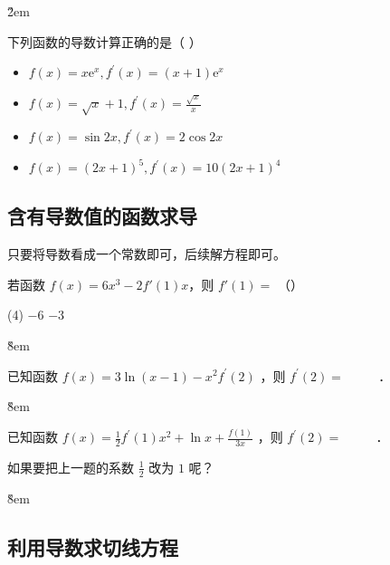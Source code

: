 \v{2em}

\begin{example}
    下列函数的导数计算正确的是（ \quad）
    \begin{itemize}
        \item $f(x)=x \mathrm{e}^x, f^{\prime}(x)=(x+1) \mathrm{e}^x$
        \item $f(x)=\sqrt{x}+1, f^{\prime}(x)=\frac{\sqrt{x}}{x}$
        \item $f(x)=\sin 2 x, f^{\prime}(x)=2 \cos 2 x$
        \item $f(x)=(2 x+1)^5, f^{\prime}(x)=10(2 x+1)^4$
    \end{itemize}
\end{example}

\subsection{含有导数值的函数求导}

\begin{theorem}
    只要将导数看成一个常数即可，后续解方程即可。
\end{theorem}

\begin{example}
    若函数 $f(x) = 6x^{3} - 2f'(1)x$，则 $f'(1) =$ （\quad）
    \begin{tasks}(4)
          \task $- 6$ \task $- 3$
    \end{tasks}
\end{example}

\v{8em}

\begin{example}
    已知函数 $f(x)=3 \ln (x-1)-x^2 f^{\prime}(2)$ ，则 $f^{\prime}(2)=$ \underline{$\qquad$} ．
\end{example}

\v{8em}

\begin{example}
    已知函数 $f(x)=\frac{1}{2} f^{\prime}(1) x^2+\ln x+\frac{f(1)}{3 x}$ ，则 $f^{\prime}(2)=$ \underline{$\qquad$} ．
\end{example}

\begin{problem}
如果要把上一题的系数 $\frac{1}{2} $ 改为 $1$ 呢？
\end{problem}

\v{8em}

\subsection{利用导数求切线方程}

